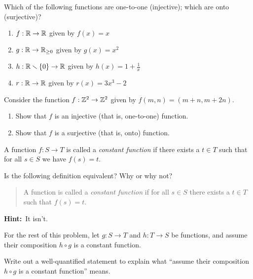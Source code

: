 
%


%
\thispagestyle{fancy}

\begin{enumerate}
  \Problem
  Which of the following functions are one-to-one (injective); which are onto (surjective)?

  \begin{enumerate}
  \item $f:\mathbb{R}\to\mathbb{R}$ given by $f(x) = x$\vfill
  \item $g:\mathbb{R}\to\mathbb{R}_{\ge0}$ given by $g(x) = x^2$\vfill
  \item $h:\mathbb{R}\smallsetminus\{0\}\to\mathbb{R}$ given by $h(x) = 1+\frac{1}{x}$\vfill
  \item $r:\mathbb{R}\to\mathbb{R}$ given by $r(x) = 3x^3-2$\vfill
  \end{enumerate}

  \Problem Consider the function $f:\mathbb{Z}^2 \to\mathbb{Z}^2$ given by $f(m,n) = (m+n,m+2n)$.
  \begin{enumerate}
  \item Show that $f$ is an injective (that is, one-to-one) function. \vfill\vfill\vfill
  \item Show that $f$ is a surjective (that is, onto) function. \vfill\vfill\vfill
  \end{enumerate}

  \newpage

  \Problem A function $f:S\to T$ is called a \emph{constant function}
  if there exists a $t\in T$ such that for all $s\in S$ we have $f(s) = t$.
  \begin{enumerate} 
    \Part Is the following definition equivalent? Why or why not?
    \begin{quote}
      A function is called a \emph{constant function} if for all $s\in
      S$ there exists a $t\in T$ such that $f(s)=t$.
    \end{quote}
    \textbf{Hint:}\ It isn't.
    \vspace{.7in}
  \end{enumerate}

  For the rest of this problem, let $g:S\to T$ and $h:T\to S$ be
  functions, and assume their composition $h\circ g$ is a constant
  function.
  \begin{enumerate}
    \Part Write out a well-quantified statement to explain what
    ``assume their composition $h\circ g$ is a constant function''
    means.  
    \vspace{.7in}


\end{enumerate}
\end{enumerate}

